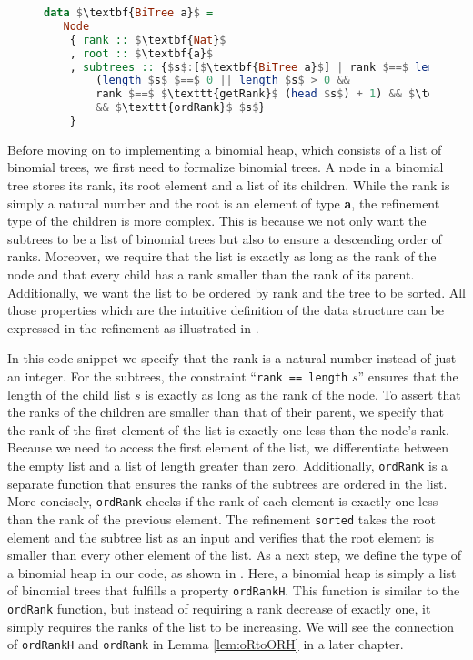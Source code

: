 \documentclass{clmthesis}
\begin{document}
\begin{figure}[h]
\begin{lstlisting}[mathescape=true, language=haskell, caption={Refinement of the data structure \textbf{BiTree a}.},captionpos=b, label=fig:Bitree]
data $\textbf{BiTree a}$ =   
   Node 
	{ rank :: $\textbf{Nat}$
	, root :: $\textbf{a}$
	, subtrees :: {$s$:[$\textbf{BiTree a}$] | rank $==$ length $s$ && 
		(length $s$ $==$ 0 || length $s$ > 0 && 
		rank $==$ $\texttt{getRank}$ (head $s$) + 1) && $\texttt{sorted}$ root $s$ 
		&& $\texttt{ordRank}$ $s$}
	}
\end{lstlisting}
\end{figure}

Before moving on to implementing a binomial heap, which consists of a list of binomial trees, we first need to formalize binomial trees. A node in a binomial tree stores its rank, its root element and a list of its children. While the rank is simply a natural number and the root is an element of type \textbf{a}, the refinement type of the children is more complex. This is because we not only want the subtrees to be a list of binomial trees but also to ensure a descending order of ranks. Moreover, we require that the list is exactly as long as the rank of the node and that every child has a rank smaller than the rank of its parent. Additionally, we want the list to be ordered by rank and the tree to be sorted. All those properties which are the intuitive definition of the data structure can be expressed in the refinement as illustrated in .

In this code snippet we specify that the rank is a natural number instead of just an integer. For the subtrees, the constraint \enquote{\lstinline{rank == length} $s$} ensures that the length of the child list $s$ is exactly as long as the rank of the node. To assert that the ranks of the children are smaller than that of their parent, we specify that the rank of the first element of the list is exactly one less than the node's rank. Because we need to access the first element of the list, we differentiate between the empty list and a list of length greater than zero. Additionally, \texttt{\lstinline{ordRank}} is a separate function that ensures the ranks of the subtrees are ordered in the list. More concisely, \texttt{\lstinline{ordRank}} checks if the rank of each element is exactly one less than the rank of the previous element. The refinement \texttt{\lstinline{sorted}} takes the root element and the subtree list as an input and verifies that the root element is smaller than every other element of the list.
\FloatBarrier
As a next step, we define the type of a binomial heap in our code, as shown in . Here, a binomial heap is simply a list of binomial trees that fulfills a property \texttt{\lstinline{ordRankH}}. This function is similar to the \texttt{\lstinline{ordRank}} function, but instead of requiring a rank decrease of exactly one, it simply requires the ranks of the list to be increasing. We will see the connection of \texttt{\lstinline{ordRankH}} and \texttt{\lstinline{ordRank}} in Lemma \ref{lem:oRtoORH} in a later chapter.
\end{document}
